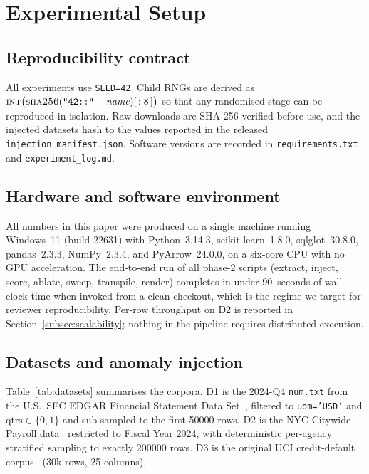 \documentclass{ieeeaccess}
\begin{document}
\FloatBarrier

\section{Experimental Setup}
\label{sec:setup}

\subsection{Reproducibility contract}
All experiments use \texttt{SEED=42}. Child RNGs are derived as
$\textsc{int}\big(\textsc{sha256}(\texttt{"42::"}+\mathit{name})[\,:8\,]\big)$ so that any randomised stage
can be reproduced in isolation. Raw downloads are SHA-256-verified before use, and the injected datasets
hash to the values reported in the released \texttt{injection\_manifest.json}. Software versions are
recorded in \texttt{requirements.txt} and \texttt{experiment\_log.md}.

\subsection{Hardware and software environment}
\label{subsec:env}
All numbers in this paper were produced on a single machine running Windows~11 (build 22631) with
Python~3.14.3, scikit-learn~1.8.0, sqlglot~30.8.0, pandas~2.3.3, NumPy~2.3.4, and PyArrow~24.0.0,
on a six-core CPU with no GPU acceleration. The end-to-end run of all phase-2 scripts (extract,
inject, score, ablate, sweep, transpile, render) completes in under 90~seconds of wall-clock time
when invoked from a clean checkout, which is the regime we target for reviewer reproducibility.
Per-row throughput on D2 is reported in Section~\ref{subsec:scalability}; nothing in the pipeline
requires distributed execution.

\subsection{Datasets and anomaly injection}
\label{subsec:datasets}
Table~\ref{tab:datasets} summarises the corpora. D1 is the 2024-Q4 \texttt{num.txt} from the U.S.\ SEC
EDGAR Financial Statement Data Set~\cite{secedgar2024}, filtered to \texttt{uom='USD'} and
$\mathrm{qtrs}\in\{0,1\}$ and sub-sampled to the first \num{50000} rows. D2 is the NYC Citywide Payroll
data~\cite{nycpayroll2024} restricted to Fiscal Year 2024, with deterministic per-agency stratified
sampling to exactly \num{200000} rows. D3 is the original UCI credit-default
corpus~\cite{yeh2009comparisons} (30k rows, 25 columns).
\end{document}
